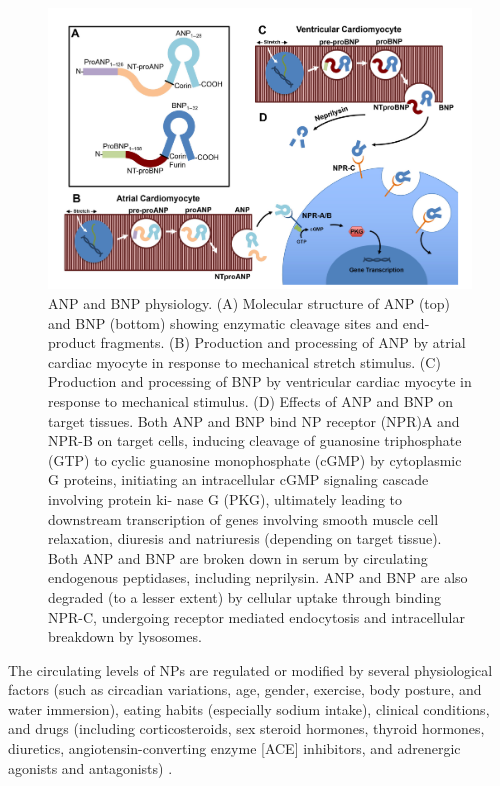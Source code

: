 \documentclass[14pt,a4paper,onecolumn]{extarticle}
\begin{document}
\begin{figure}      \centering      \includegraphics[scale=0.4]{../../images/NP_physiology.png}      \caption{ANP and BNP physiology. (A) Molecular structure of ANP (top) and BNP (bottom) showing enzymatic cleavage sites and end-product fragments. (B) Production and processing of ANP by atrial cardiac myocyte in response to mechanical stretch stimulus. (C) Production and processing of BNP by ventricular cardiac myocyte in response to mechanical stimulus. (D) Effects of ANP and BNP on target tissues. Both ANP and BNP bind NP receptor (NPR)A and NPR-B on target cells, inducing cleavage of guanosine triphosphate (GTP) to cyclic guanosine monophosphate (cGMP) by cytoplasmic G proteins, initiating an intracellular cGMP signaling cascade involving protein ki- nase G (PKG), ultimately leading to downstream transcription of genes involving smooth muscle cell relaxation, diuresis and natriuresis (depending on target tissue). Both ANP and BNP are broken down in serum by circulating endogenous peptidases, including neprilysin. ANP and BNP are also degraded (to a lesser extent) by cellular uptake through binding NPR-C, undergoing receptor mediated endocytosis and intracellular breakdown by lysosomes. \citep{Maisel2018}}       \label{NP_physiology}  \end{figure}

The circulating levels of NPs are regulated or modified by several physiological factors (such as circadian variations, age, gender, exercise, body posture, and water immersion), eating habits (especially sodium intake), clinical conditions, and drugs (including corticosteroids, sex steroid hormones, thyroid hormones, diuretics, angiotensin-converting enzyme [ACE] inhibitors, and adrenergic agonists and antagonists) \citep{bib31} \citep{bib32} \citep{bib33} \citep{bib34} \citep{bib35} \citep{bib36}. %
\end{document}
